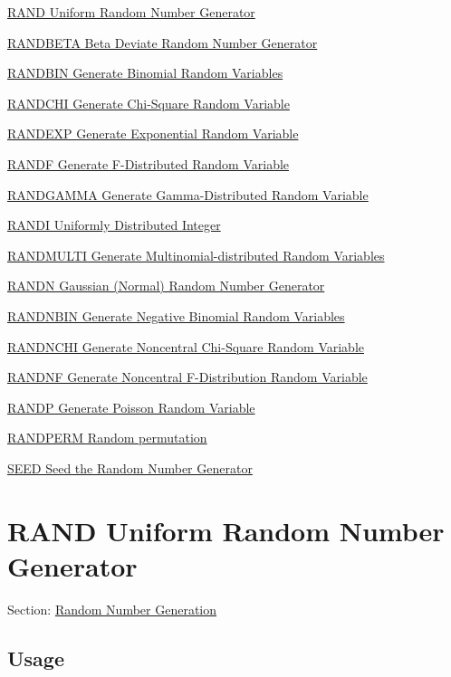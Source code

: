 
\begin{DoxyItemize}
\item \hyperlink{random_rand}{R\-A\-N\-D Uniform Random Number Generator}  
\item \hyperlink{random_randbeta}{R\-A\-N\-D\-B\-E\-T\-A Beta Deviate Random Number Generator}  
\item \hyperlink{random_randbin}{R\-A\-N\-D\-B\-I\-N Generate Binomial Random Variables}  
\item \hyperlink{random_randchi}{R\-A\-N\-D\-C\-H\-I Generate Chi-\/\-Square Random Variable}  
\item \hyperlink{random_randexp}{R\-A\-N\-D\-E\-X\-P Generate Exponential Random Variable}  
\item \hyperlink{random_randf}{R\-A\-N\-D\-F Generate F-\/\-Distributed Random Variable}  
\item \hyperlink{random_randgamma}{R\-A\-N\-D\-G\-A\-M\-M\-A Generate Gamma-\/\-Distributed Random Variable}  
\item \hyperlink{random_randi}{R\-A\-N\-D\-I Uniformly Distributed Integer}  
\item \hyperlink{random_randmulti}{R\-A\-N\-D\-M\-U\-L\-T\-I Generate Multinomial-\/distributed Random Variables}  
\item \hyperlink{random_randn}{R\-A\-N\-D\-N Gaussian (Normal) Random Number Generator}  
\item \hyperlink{random_randnbin}{R\-A\-N\-D\-N\-B\-I\-N Generate Negative Binomial Random Variables}  
\item \hyperlink{random_randnchi}{R\-A\-N\-D\-N\-C\-H\-I Generate Noncentral Chi-\/\-Square Random Variable}  
\item \hyperlink{random_randnf}{R\-A\-N\-D\-N\-F Generate Noncentral F-\/\-Distribution Random Variable}  
\item \hyperlink{random_randp}{R\-A\-N\-D\-P Generate Poisson Random Variable}  
\item \hyperlink{random_randperm}{R\-A\-N\-D\-P\-E\-R\-M Random permutation}  
\item \hyperlink{random_seed}{S\-E\-E\-D Seed the Random Number Generator}  
\end{DoxyItemize}\hypertarget{random_rand}{}\section{R\-A\-N\-D Uniform Random Number Generator}\label{random_rand}
Section\-: \hyperlink{sec_random}{Random Number Generation} \hypertarget{vtkwidgets_vtkxyplotwidget_Usage}{}\subsection{Usage}\label{vtkwidgets_vtkxyplotwidget_Usage}
